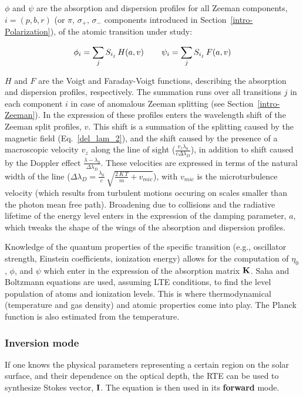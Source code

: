 \documentclass[goettingen, gauss, print]{thesis}
\begin{document}
$\phi$ and $\psi$ are the absorption and dispersion profiles for all Zeeman components, $i=(p,b,r)$ (or $\pi,\, \sigma_{+}, \,\sigma_{-}$ components introduced in Section~\ref{intro-Polarization}), of the atomic transition under study:

\begin{equation}
\phi_i = \sum_j S_{i_{j}} \, H(a,v) \hspace*{0.3 in} \psi_i = \sum_j S_{i_{j}} \, F(a,v) 
\end{equation}

$H$ and $F$ are the Voigt and Faraday-Voigt functions, describing the absorption and dispersion profiles, respectively. The summation runs over all transitions $j$ in each component $i$ in case of anomalous Zeeman splitting (see Section~\ref{intro-Zeeman}). 
In the expression of these profiles enters the wavelength shift of the Zeeman split profiles, $v$. This shift is a summation of the splitting caused by the magnetic field (Eq.~\ref{del_lam_2}), and the shift caused by the presence of a macroscopic velocity $v_z$ along the line of sight ($\frac{v_z \lambda_0}{c \Delta \lambda_D}$), in addition to shift caused by the Doppler effect $\frac{\lambda - \lambda_0}{\Delta \lambda_D}$. These velocities are expressed in terms of the natural width of the line ($\Delta \lambda_D = \frac{\lambda_0}{c}\,\sqrt{\frac{2\,K\,T}{m}+v_{mic}}$), with $v_{mic}$ is the microturbulence velocity (which results from turbulent motions occuring on scales smaller than the photon mean free path). Broadening due to collisions and the radiative lifetime of the energy level enters in the expression of the damping parameter, $a$, which tweaks the shape of the wings of the absorption and dispersion profiles.

Knowledge of the quantum properties of the specific transition (e.g., oscillator strength, Einstein coefficients, ionization energy) allows for the computation of $\eta_0$, $\phi$, and $\psi$ which enter in the expression of the absorption matrix $\bold{K}$. Saha and Boltzmann equations are used, assuming LTE conditions, to find the level population of atoms and ionization levels. This is where thermodynamical (temperature and gas density) and atomic properties come into play. The Planck function is also estimated from the temperature.

\subsubsection{Inversion mode}
If one knows the physical parameters representing a certain region on the solar surface, and their dependence on the optical depth, the RTE can be used to synthesize Stokes vector, $\bold{I}$. The equation is then used in its \textbf{forward} mode.
\end{document}
